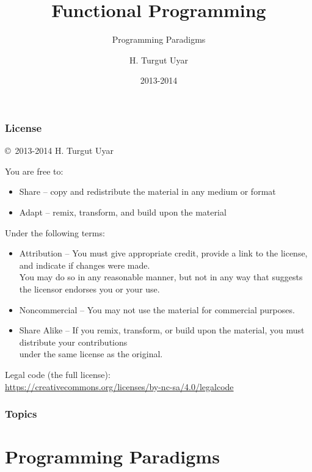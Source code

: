 \documentclass[dvipsnames]{beamer}
\title{Functional Programming}
\subtitle{Programming Paradigms}
\author{H. Turgut Uyar}
\date{2013-2014}
\theoremstyle{plain}
\begin{document}

\begin{frame}
  \titlepage
\end{frame}

\begin{frame}
  \frametitle{License}

  \hfill
  \copyright~2013-2014 H. Turgut Uyar

  \vfill
  \begin{tiny}
    You are free to:
    \begin{itemize}
      \item Share -- copy and redistribute the material in any medium or format
      \item Adapt -- remix, transform, and build upon the material
    \end{itemize}

    Under the following terms:
    \begin{itemize}
      \item Attribution -- You must give appropriate credit, provide a link to
        the license, and indicate if changes were made.\\
        You may do so in any reasonable manner, but not in any way
        that suggests the licensor endorses you or your use.

      \item Noncommercial -- You may not use the material for commercial
        purposes.

      \item Share Alike -- If you remix, transform, or build upon the material,
        you must distribute your contributions\\
        under the same license as the original.
    \end{itemize}
  \end{tiny}

  \vfill
  \begin{small}
    Legal code (the full license):\\
    \url{https://creativecommons.org/licenses/by-nc-sa/4.0/legalcode}
  \end{small}
\end{frame}

\begin{frame}
  \frametitle{Topics}
  \tableofcontents
\end{frame}

\section{Programming Paradigms}
\end{document}
